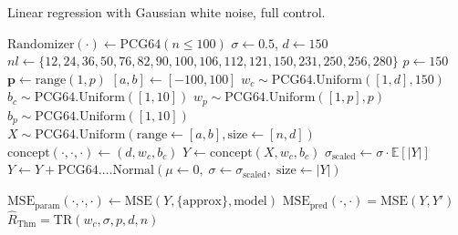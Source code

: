 \documentclass[twoside,10pt]{article}
\begin{document}
\begin{algorithm}
    \caption{Linear regression with Gaussian white noise, full control.}
    \Begin
    {
    $\mathrm{Randomizer}(\cdot)\gets\mathrm{PCG64}(n\leq 100)$
    $\sigma\gets 0.5$, $d\gets 150$
    $nl\gets\{12,24,36,50,76,82,90,100,106,112,121,150,231,250,256,280\}$
    $p\gets 150$
    $\mathbf{p}\gets \mathrm{range}(1,p)$\; $[a,b]\gets [-100,100]$\;
    $w_{c}\sim \mathrm{PCG64}.\mathrm{Uniform}([1,d],150)$\; $b_{c}\sim \mathrm{PCG64}.\mathrm{Uniform}([1,10])$\;
    $w_{p}\sim \mathrm{PCG64}.\mathrm{Uniform}([1,p],p)$\; $b_{p}\sim \mathrm{PCG64}.\mathrm{Uniform}([1,10])$\;
    $X\sim\mathrm{PCG64}.\mathrm{Uniform}(\mathrm{range}\gets[a,b],\mathrm{size}\gets[n,d])$
    $\mathrm{concept}(\cdot,\cdot,\cdot)\gets (d,w_{c},b_{c})$\;
    $Y \gets \mathrm{concept}(X, w_{c},b_{c})$\;
    $\sigma_{\mathrm{scaled}} \gets \sigma \cdot \mathbb{E}\left[\lvert Y\rvert\right]$\;
    $Y \gets Y + \mathrm{PCG64}.…\mathrm{Normal}\left(\mu\gets 0,\;\sigma\gets \sigma_{\mathrm{scaled}},\;\mathrm{size}\gets\lvert Y\rvert\right)$ 

    $\mathrm{MSE}_{\mathrm{param}}(\cdot,\cdot,\cdot)\gets \mathrm{MSE}(Y,\{\mathrm{approx}\},\mathrm{model})$\;
    $\mathrm{MSE}_{\mathrm{pred}}(\cdot,\cdot)=\mathrm{MSE}(Y,Y')$
    $\hat{R}_{\mathrm{Thm}}=\mathrm{TR}(w_{c},\sigma,p,d,n)$\;
    }
    \label{algo:algo_reg_lin_1}
\end{algorithm}
\end{document}

